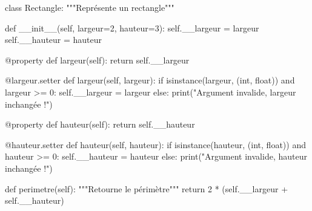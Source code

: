 \documentclass[
  a4paper,
  DIV=11,
  numbers=noendperiod]{scrartcl}
\newenvironment{Shaded}{\begin{snugshade}}{\end{snugshade}}
\newcommand{\AttributeTok}[1]{\textcolor[rgb]{0.40,0.45,0.13}{#1}}
\newcommand{\BuiltInTok}[1]{\textcolor[rgb]{0.00,0.23,0.31}{#1}}
\newcommand{\CommentTok}[1]{\textcolor[rgb]{0.37,0.37,0.37}{#1}}
\newcommand{\ControlFlowTok}[1]{\textcolor[rgb]{0.00,0.23,0.31}{#1}}
\newcommand{\DecValTok}[1]{\textcolor[rgb]{0.68,0.00,0.00}{#1}}
\newcommand{\FunctionTok}[1]{\textcolor[rgb]{0.28,0.35,0.67}{#1}}
\newcommand{\KeywordTok}[1]{\textcolor[rgb]{0.00,0.23,0.31}{#1}}
\newcommand{\NormalTok}[1]{\textcolor[rgb]{0.00,0.23,0.31}{#1}}
\newcommand{\OperatorTok}[1]{\textcolor[rgb]{0.37,0.37,0.37}{#1}}
\newcommand{\StringTok}[1]{\textcolor[rgb]{0.13,0.47,0.30}{#1}}
\newcommand{\VariableTok}[1]{\textcolor[rgb]{0.07,0.07,0.07}{#1}}
\begin{document}
\begin{Shaded}
\begin{Highlighting}[]
\KeywordTok{class}\NormalTok{ Rectangle:}
    \CommentTok{"""Représente un rectangle"""}

    \KeywordTok{def} \FunctionTok{\_\_init\_\_}\NormalTok{(}\VariableTok{self}\NormalTok{, largeur}\OperatorTok{=}\DecValTok{2}\NormalTok{, hauteur}\OperatorTok{=}\DecValTok{3}\NormalTok{):}
        \VariableTok{self}\NormalTok{.\_\_largeur }\OperatorTok{=}\NormalTok{ largeur}
        \VariableTok{self}\NormalTok{.\_\_hauteur }\OperatorTok{=}\NormalTok{ hauteur}

    \AttributeTok{@property}
    \KeywordTok{def}\NormalTok{ largeur(}\VariableTok{self}\NormalTok{):}
        \ControlFlowTok{return} \VariableTok{self}\NormalTok{.\_\_largeur}

    \AttributeTok{@largeur.setter}
    \KeywordTok{def}\NormalTok{ largeur(}\VariableTok{self}\NormalTok{, largeur):}
        \ControlFlowTok{if} \BuiltInTok{isinstance}\NormalTok{(largeur, (}\BuiltInTok{int}\NormalTok{, }\BuiltInTok{float}\NormalTok{)) }\KeywordTok{and}\NormalTok{ largeur }\OperatorTok{\textgreater{}=} \DecValTok{0}\NormalTok{:}
            \VariableTok{self}\NormalTok{.\_\_largeur }\OperatorTok{=}\NormalTok{ largeur}
        \ControlFlowTok{else}\NormalTok{:}
            \BuiltInTok{print}\NormalTok{(}\StringTok{"Argument invalide, largeur inchangée !"}\NormalTok{)}

    \AttributeTok{@property}
    \KeywordTok{def}\NormalTok{ hauteur(}\VariableTok{self}\NormalTok{):}
        \ControlFlowTok{return} \VariableTok{self}\NormalTok{.\_\_hauteur}

    \AttributeTok{@hauteur.setter}
    \KeywordTok{def}\NormalTok{ hauteur(}\VariableTok{self}\NormalTok{, hauteur):}
        \ControlFlowTok{if} \BuiltInTok{isinstance}\NormalTok{(hauteur, (}\BuiltInTok{int}\NormalTok{, }\BuiltInTok{float}\NormalTok{)) }\KeywordTok{and}\NormalTok{ hauteur }\OperatorTok{\textgreater{}=} \DecValTok{0}\NormalTok{:}
            \VariableTok{self}\NormalTok{.\_\_hauteur }\OperatorTok{=}\NormalTok{ hauteur}
        \ControlFlowTok{else}\NormalTok{:}
            \BuiltInTok{print}\NormalTok{(}\StringTok{"Argument invalide, hauteur inchangée !"}\NormalTok{)}

    \KeywordTok{def}\NormalTok{ perimetre(}\VariableTok{self}\NormalTok{):}
        \CommentTok{"""Retourne le périmètre"""}
        \ControlFlowTok{return} \DecValTok{2} \OperatorTok{*}\NormalTok{ (}\VariableTok{self}\NormalTok{.\_\_largeur }\OperatorTok{+} \VariableTok{self}\NormalTok{.\_\_hauteur)}


\end{Highlighting}
\end{Shaded}
\end{document}

